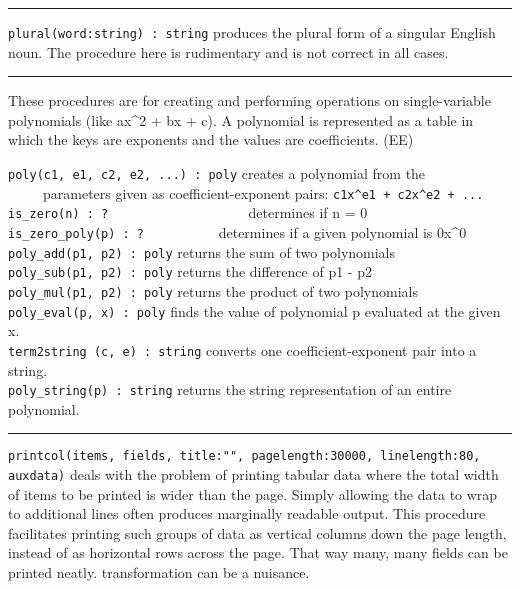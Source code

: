 \vspace{0.25cm}\hrule{}

\texttt{plural(word:string) : string} produces the plural form of a singular English noun. The procedure here is
rudimentary and is not correct in all cases. 

\vspace{0.25cm}\hrule{}

These procedures are for creating and performing operations on
single-variable polynomials (like ax\^{}2 + bx + c).
A polynomial is represented as a table in which the keys are exponents
and the values are coefficients. (EE)

\texttt{poly(c1, e1, c2, e2, ...) : poly} creates a polynomial from
the\\
 \ \ \ \ \ parameters given as coefficient-exponent pairs:
\texttt{c1x\^{}e1 + c2x\^{}e2 + ...}\\
\texttt{is\_zero(n) : ?
\ }\ \ \ \ \ \ \ \ \ \ \ \ \ \ \ \ \ \ determines if n = 0\\
\texttt{is\_zero\_poly(p) : ?} \ \ \ \ \ \ \ \ \ \ determines if a given
polynomial is 0x\^{}0\\
\texttt{poly\_add(p1, p2) : poly} returns the sum of two
polynomials\\
\texttt{poly\_sub(p1, p2) : poly} returns the difference of p1 -
p2\\
\texttt{poly\_mul(p1, p2) : poly} returns the product of two
polynomials\\
\texttt{poly\_eval(p, x) : poly} finds the value of polynomial p
evaluated at the given x.\\
\texttt{term2string (c, e) : string} converts one coefficient-exponent
pair into a string.\\
\texttt{poly\_string(p) : string} returns the string representation of
an entire polynomial. 

\vspace{0.25cm}\hrule{}

\texttt{printcol(items, fields, title:"",
pagelength:30000, linelength:80, auxdata)} deals with the problem of
printing tabular data where the total width of items to be printed is
wider than the page. Simply allowing the data to wrap to additional
lines often produces marginally readable output. This procedure
facilitates printing such groups of data as vertical columns down the
page length, instead of as horizontal rows across the page. That way
many, many fields can be printed neatly.%
transformation can be a nuisance.%

